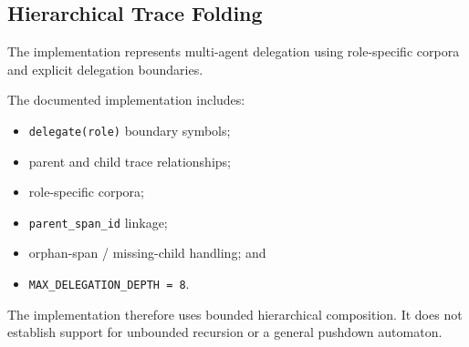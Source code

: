 \documentclass[11pt,a4paper]{article}
\begin{document}
\subsection{Hierarchical Trace Folding}

The implementation represents multi-agent delegation using role-specific corpora and
explicit delegation boundaries.

The documented implementation includes:

\begin{itemize}
\item \texttt{delegate(role)} boundary symbols;
\item parent and child trace relationships;
\item role-specific corpora;
\item \texttt{parent\_span\_id} linkage;
\item orphan-span / missing-child handling; and
\item \texttt{MAX\_DELEGATION\_DEPTH = 8}.
\end{itemize}

The implementation therefore uses bounded hierarchical composition. It does not establish
support for unbounded recursion or a general pushdown automaton.
\end{document}
